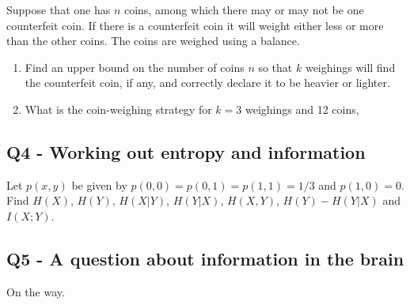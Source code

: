 \documentclass[12pt]{article}
\begin{document}
Suppose that one has $n$ coins, among which there may or may not be one counterfeit coin. If there is a counterfeit coin it will weight either less or more than the other coins. The coins are weighed using a balance.
\begin{enumerate}
\item Find an upper bound on the number of coins $n$ so that $k$ weighings will find the counterfeit coin, if any, and correctly declare it to be heavier or lighter.
\item What is the coin-weighing strategy for $k=3$ weighings and 12 coins,
\end{enumerate}

\subsection*{Q4 - Working out entropy and information}

Let $p(x,y)$ be given by $p(0,0)=p(0,1)=p(1,1)=1/3$ and
$p(1,0)=0$. Find $H(X)$, $H(Y)$, $H(X|Y)$, $H(Y|X)$, $H(X,Y)$,
$H(Y)-H(Y|X)$ and $I(X;Y)$.

\subsection*{Q5 - A question about information in the brain}

On the way.
\end{document}
